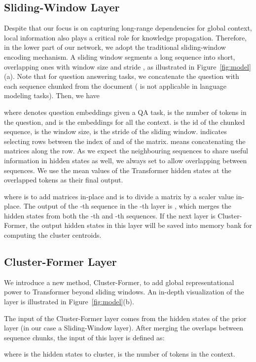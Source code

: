 \documentclass[11pt,a4paper]{article}
\begin{document}
\subsection{Sliding-Window Layer}
Despite that our focus is on capturing long-range dependencies for global context, local information also plays a critical role for knowledge propagation.
Therefore, in the lower part of our network, we adopt the traditional sliding-window encoding mechanism.
A sliding window segments a long sequence  into short, overlapping ones with window size  and stride , as illustrated in Figure~\ref{fig:model}(a). 
Note that for question answering tasks, we concatenate the question  with each sequence chunked from the document ( is not applicable in language modeling tasks). Then, we have

where  denotes question embeddings given a QA task,  is the number of tokens in the question, and  is the embeddings for all the context.
 is the id of the chunked sequence,  is the window size,  is the stride of the sliding window.
 indicates selecting rows between the index of  and  of the matrix.
 means concatenating the matrices along the row.
As we expect the neighbouring sequences to share useful information in hidden states as well, we always set  to allow overlapping between sequences.
We use the mean values of the Transformer hidden states at the overlapped tokens as their final output.

where  is to add matrices in-place and  is to divide a matrix by a scaler value in-place. 
The output of the -th sequence in the -th layer is  , which merges the hidden states from both the -th and -th sequences.
If the next layer is Cluster-Former, the output hidden states in this layer  will be saved into memory bank for computing the cluster centroids.


\subsection{Cluster-Former Layer}
\label{sec:trans_clusters}
We introduce a new method, Cluster-Former,
to add global representational power to Transformer beyond sliding windows.
An in-depth visualization of the layer is illustrated in Figure~\ref{fig:model}(b).

The input of the Cluster-Former layer comes from the hidden states of the prior layer (in our case a Sliding-Window layer).
After merging the overlaps between sequence chunks, the input of this layer is defined as:

where  is the hidden states to cluster,  is the number of tokens in the context.
\end{document}
